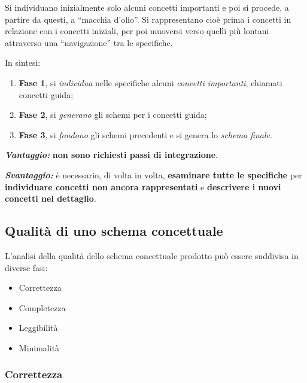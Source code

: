 \documentclass[a4paper]{article}
\newcommand{\dquotes}[1]{``#1''}
\begin{document}
	Si individuano inizialmente solo alcuni concetti importanti e poi si procede, a partire da questi, a \dquotes{macchia d'olio}. Si rappresentano cioè prima i concetti in relazione con i concetti iniziali, per poi muoversi verso quelli più lontani attraverso una \dquotes{navigazione} tra le specifiche.\newline
	
	\noindent
	In sintesi:
	
	\begin{enumerate}
		\item \textbf{Fase 1}, si \emph{individua} nelle specifiche alcuni \emph{concetti importanti}, chiamati concetti guida;
		
		\item \textbf{Fase 2}, si \emph{generano} gli schemi per i concetti guida;
		
		\item \textbf{Fase 3}, si \emph{fondono} gli schemi precedenti e si genera lo \emph{schema finale}.
	\end{enumerate}
	
	\noindent
	\textcolor{Green4}{\textbf{\emph{Vantaggio:}}} \textbf{non sono richiesti passi di integrazione}.\newline
	
	\noindent
	\textcolor{Red3}{\textbf{\emph{Svantaggio:}}} è necessario, di volta in volta, \textbf{esaminare tutte le specifiche} per \textbf{individuare concetti non ancora rappresentati} e \textbf{descrivere i nuovi concetti nel dettaglio}.
	
	\newpage
	
	\subsection{Qualità di uno schema concettuale}
	
	L'analisi della qualità dello schema concettuale prodotto può essere suddivisa in diverse fasi:
	
	\begin{itemize}
		\item Correttezza
		\item Completezza
		\item Leggibilità
		\item Minimalità
	\end{itemize}

	\subsubsection{Correttezza}\label{par: correttezza}
\end{document}
